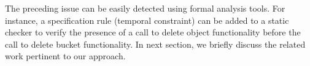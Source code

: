 The preceding issue can be easily detected using formal analysis tools.
For instance, a specification rule (temporal constraint) can be added to a static checker to verify
the presence of a call to delete object functionality before the call to delete bucket functionality.
In next section, we briefly discuss the related work pertinent to our approach.


 








